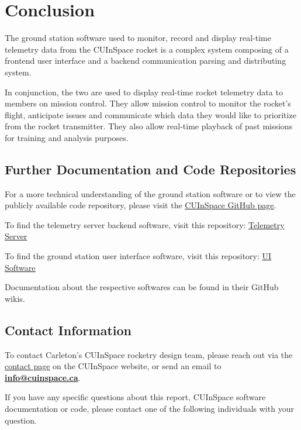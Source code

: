 \sectionfont{\fontsize{14}{14}\selectfont}
\section{Conclusion}

The ground station software used to monitor, record and display real-time telemetry data from the CUInSpace rocket is a
complex system composing of a frontend user interface and a backend communication parsing and distributing system.

In conjunction, the two are used to display real-time rocket telemetry data to members on mission control. They allow
mission control to monitor the rocket's flight, anticipate issues and communicate which data they would like to prioritize from 
the rocket transmitter. They also allow real-time playback of past missions for training and analysis purposes.

\subsection*{Further Documentation and Code Repositories}
For a more technical understanding of the ground station software or to view the publicly available code repository,
please visit the \href{https://github.com/CarletonURocketry}{\underline{CUInSpace GitHub page}}.

To find the telemetry server backend software, visit this repository:
\href{https://github.com/CarletonURocketry/ground-station}{\underline{Telemetry Server}}

To find the ground station user interface software, visit this repository:
\href{https://github.com/CarletonURocketry/ground-station-ui}{\underline{UI Software}} 

Documentation about the respective softwares can be found in their GitHub wikis.

\subsection*{Contact Information}

To contact Carleton's CUInSpace rocketry design team, please reach out via the \href{https://www.cuinspace.ca/contact-us}
{\underline{contact page}} on the CUInSpace website, or send an email to \href{mailto:info@cuinspace.ca?subject=Question regarding CU InSpace Software}{\textbf{info@cuinspace.ca}}.

If you have any specific questions about this report, CUInSpace software documentation or code, please contact one of the 
following individuals with your question.

